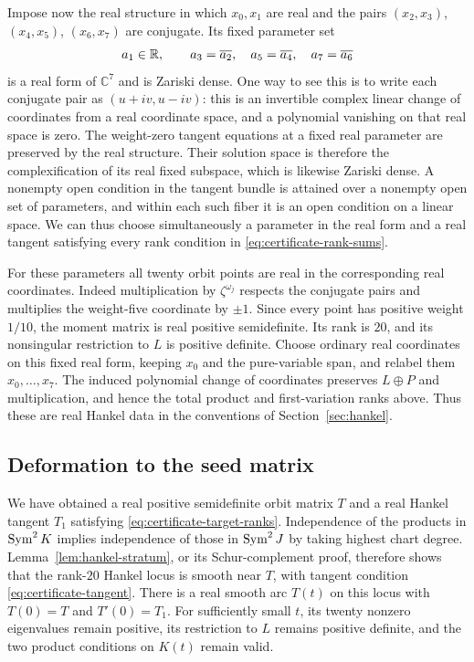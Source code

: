 Impose now the real structure in which $x_0,x_1$ are real and the
pairs $(x_2,x_3)$, $(x_4,x_5)$, $(x_6,x_7)$ are conjugate.  Its
fixed parameter set
\[
 a_1\in\mathbb R,\qquad a_3=\overline{a_2},\quad
 a_5=\overline{a_4},\quad a_7=\overline{a_6}
\]
is a real form of $\mathbb C^7$ and is Zariski dense.  One way to
see this is to write each conjugate pair as $(u+iv,u-iv)$: this is
an invertible complex linear change of coordinates from a real
coordinate space, and a polynomial vanishing on that real space
is zero.  The weight-zero tangent equations at a fixed real
parameter are preserved by the real structure.  Their solution
space is therefore the complexification of its real fixed
subspace, which is likewise Zariski dense.  A nonempty open
condition in the tangent bundle is attained over a nonempty open
set of parameters, and within each such fiber it is an open
condition on a linear space.  We can thus choose simultaneously
a parameter in the real form and a real tangent satisfying every
rank condition in \eqref{eq:certificate-rank-sums}.

For these parameters all twenty orbit points are real in the
corresponding real coordinates.  Indeed multiplication by
$\zeta^{\omega_j}$ respects the conjugate pairs and multiplies
the weight-five coordinate by $\pm1$.  Since every point has
positive weight $1/10$, the moment matrix is real positive
semidefinite.  Its rank is $20$, and its nonsingular restriction
to $L$ is positive definite.
Choose ordinary real coordinates on this fixed real form, keeping
$x_0$ and the pure-variable span, and relabel them $x_0,\ldots,x_7$.
The induced polynomial change of coordinates preserves $L\oplus P$
and multiplication, and hence the total product and first-variation
ranks above. Thus these are real Hankel data in the conventions of
Section~\ref{sec:hankel}.

\subsection{Deformation to the seed matrix}

We have obtained a real positive semidefinite orbit matrix $T$ and
a real Hankel tangent $T_1$ satisfying
\eqref{eq:certificate-target-ranks}.  Independence of the products
in $\operatorname{Sym}^2K$ implies independence of those in $\operatorname{Sym}^2J$ by taking
highest chart degree.  Lemma~\ref{lem:hankel-stratum}, or its
Schur-complement proof, therefore shows that the rank-$20$ Hankel
locus is smooth near $T$, with tangent condition
\eqref{eq:certificate-tangent}.  There is a real smooth arc
$T(t)$ on this locus with $T(0)=T$ and $T'(0)=T_1$.
For sufficiently small $t$, its twenty nonzero eigenvalues remain
positive, its restriction to $L$ remains positive definite, and
the two product conditions on $K(t)$ remain valid.

